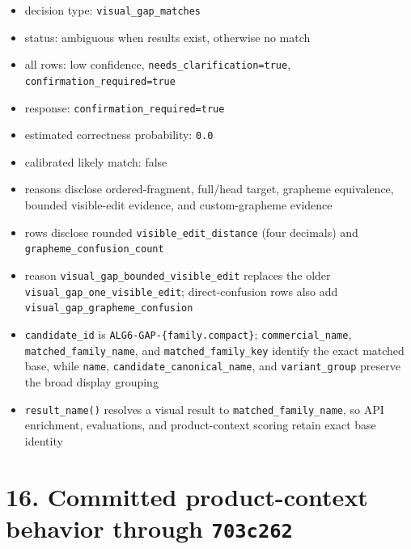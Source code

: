 \begin{itemize}
\tightlist
\item
  decision type: \texttt{visual\_\allowbreak{}gap\_\allowbreak{}matches}
\item
  status: ambiguous when results exist, otherwise no match
\item
  all rows: low confidence, \texttt{needs\_\allowbreak{}clarification=true}, \texttt{confirmation\_\allowbreak{}required=true}
\item
  response: \texttt{confirmation\_\allowbreak{}required=true}
\item
  estimated correctness probability: \texttt{0.0}
\item
  calibrated likely match: false
\item
  reasons disclose ordered-fragment, full/head target, grapheme equivalence, bounded visible-edit evidence, and custom-grapheme evidence
\item
  rows disclose rounded \texttt{visible\_\allowbreak{}edit\_\allowbreak{}distance} (four decimals) and \texttt{grapheme\_\allowbreak{}confusion\_\allowbreak{}count}
\item
  reason \texttt{visual\_\allowbreak{}gap\_\allowbreak{}bounded\_\allowbreak{}visible\_\allowbreak{}edit} replaces the older \texttt{visual\_\allowbreak{}gap\_\allowbreak{}one\_\allowbreak{}visible\_\allowbreak{}edit}; direct-confusion rows also add \texttt{visual\_\allowbreak{}gap\_\allowbreak{}grapheme\_\allowbreak{}confusion}
\item
  \texttt{candidate\_\allowbreak{}id} is \texttt{ALG6-GAP-\{family.compact\}}; \texttt{commercial\_\allowbreak{}name}, \texttt{matched\_\allowbreak{}family\_\allowbreak{}name}, and \texttt{matched\_\allowbreak{}family\_\allowbreak{}key} identify the exact matched base, while \texttt{name}, \texttt{candidate\_\allowbreak{}canonical\_\allowbreak{}name}, and \texttt{variant\_\allowbreak{}group} preserve the broad display grouping
\item
  \texttt{result\_\allowbreak{}name()} resolves a visual result to \texttt{matched\_\allowbreak{}family\_\allowbreak{}name}, so API enrichment, evaluations, and product-context scoring retain exact base identity
\end{itemize}

\section{\texorpdfstring{16. Committed product-context behavior through \texttt{703c262}}{16. Committed product-context behavior through 703c262}}\label{16-committed-product-context-behavior-through-703c262}

